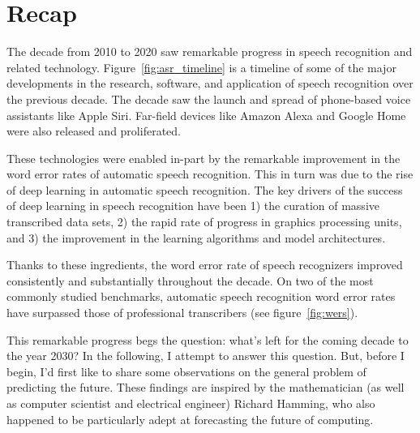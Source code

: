 \section{Recap}
\label{sec:recap}

The decade from 2010 to 2020 saw remarkable progress in speech recognition and
related technology. Figure~\ref{fig:asr_timeline} is a timeline of some of the
major developments in the research, software, and application of speech
recognition over the previous decade. The decade saw the launch and spread of
phone-based voice assistants like Apple Siri. Far-field devices like Amazon
Alexa and Google Home were also released and proliferated.

These technologies were enabled in-part by the remarkable improvement in the
word error rates of automatic speech recognition. This in turn was due to the
rise of deep learning in automatic speech recognition. The key drivers of the
success of deep learning in speech recognition have been 1) the curation of
massive transcribed data sets, 2) the rapid rate of progress in graphics
processing units, and 3) the improvement in the learning algorithms and model
architectures.

Thanks to these ingredients, the word error rate of speech recognizers improved
consistently and substantially throughout the decade. On two of the most
commonly studied benchmarks, automatic speech recognition word error rates have
surpassed those of professional transcribers (see figure~\ref{fig:wers}).

This remarkable progress begs the question: what's left for the coming
decade to the year 2030? In the following, I attempt to answer this question.
But, before I begin, I'd first like to share some observations on the general
problem of predicting the future. These findings are inspired by the
mathematician (as well as computer scientist and electrical engineer) Richard
Hamming, who also happened to be particularly adept at forecasting the future
of computing.

